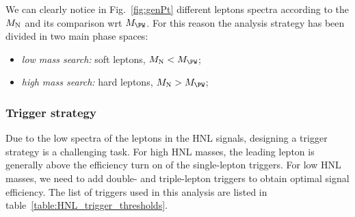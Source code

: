 We can clearly notice in Fig.~\ref{fig:genPt} different leptons \pt spectra according to the
$M_\mathrm{N}$ and its comparison wrt $M_\PW$. For this reason the analysis
strategy has been divided in two main phase spaces:
\begin{itemize}
\setlength\itemsep{-0.1em}
\item \emph{low mass search:} soft leptons, $M_\hnl < M_\PW$;
\item \emph{high mass search:} hard leptons, $M_\hnl > M_\PW$;
\end{itemize}

\subsubsection{Trigger strategy}
Due to the low \pt spectra of the leptons in the HNL signals, designing a trigger strategy is a challenging task. 
For high HNL masses, the leading lepton \pt is generally above the efficiency turn on of the single-lepton triggers.
For low HNL masses, we need to add double- and triple-lepton triggers to obtain optimal signal efficiency.
The list of triggers used in this analysis are listed in table~\ref{table:HNL_trigger_thresholds}.


